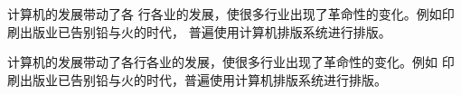 \documentclass{ctexart}
\begin{document}
计算机的发展带动了各\vspace*{10mm} 行各业的发展，使很多行业出现了革命性的变化。例如印刷出版业已告别铅与火的时代，
普遍使用计算机排版系统进行排版。\vfill

计算机的发展带动了各行各业的发展，使很多行业出现了革命性的变化。例如
 印刷出版业已告别铅与火的时代，普遍使用计算机排版系统进行排版。
\end{document}
